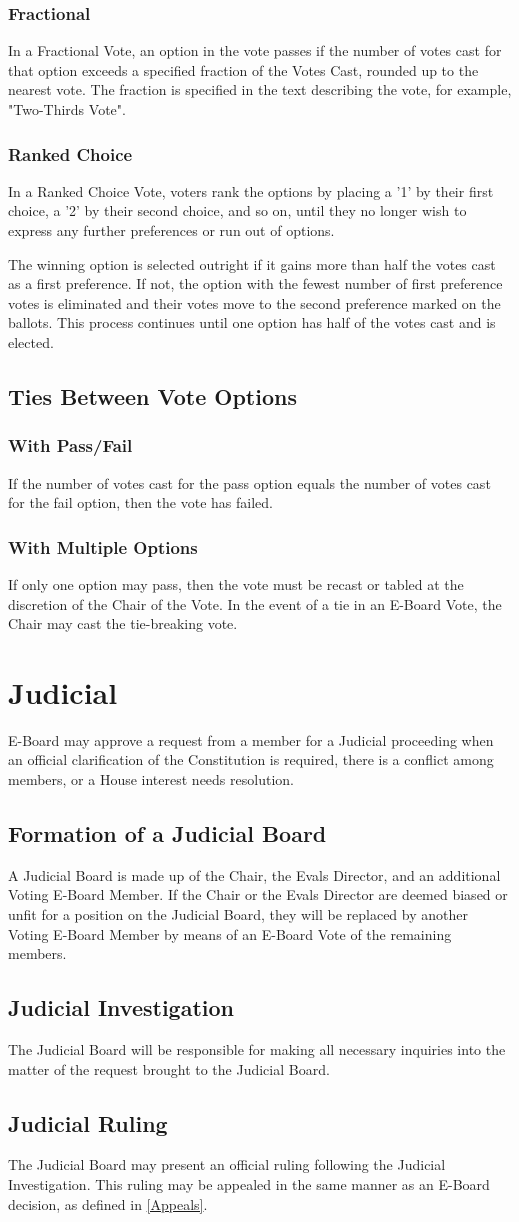 \documentclass{article}
\newcommand{\article}[1]{\section{#1} \label{#1}}
\newcommand{\asection}[1]{\subsection{#1} \label{#1}}
\newcommand{\asubsection}[1]{\subsubsection{#1} \label{#1}}
\begin{document}
\asubsection{Fractional}
In a Fractional Vote, an option in the vote passes if the number of votes cast for that option exceeds a specified fraction of the Votes Cast, rounded up to the nearest vote.
The fraction is specified in the text describing the vote, for example, "Two-Thirds Vote".

\asubsection{Ranked Choice}
In a Ranked Choice Vote, voters rank the options by placing a '1' by their first choice, a '2' by their second choice, and so on, until they no longer wish to express any further preferences or run out of options.

The winning option is selected outright if it gains more than half the votes cast as a first preference.
If not, the option with the fewest number of first preference votes is eliminated and their votes move to the second preference marked on the ballots.
This process continues until one option has half of the votes cast and is elected.

\asection{Ties Between Vote Options}

\asubsection{With Pass/Fail}
If the number of votes cast for the pass option equals the number of votes cast for the fail option, then the vote has failed.

\asubsection{With Multiple Options}
If only one option may pass, then the vote must be recast or tabled at the discretion of the Chair of the Vote.
In the event of a tie in an E-Board Vote, the Chair may cast the tie-breaking vote.

\article{Judicial}
E-Board may approve a request from a member for a Judicial proceeding when an official clarification of the Constitution is required, there is a conflict among members, or a House interest needs resolution.

\asection{Formation of a Judicial Board}
A Judicial Board is made up of the Chair, the Evals Director, and an additional Voting E-Board Member.
If the Chair or the Evals Director are deemed biased or unfit for a position on the Judicial Board, they will be replaced by another Voting E-Board Member by means of an E-Board Vote of the remaining members.

\asection{Judicial Investigation}
The Judicial Board will be responsible for making all necessary inquiries into the matter of the request brought to the Judicial Board.

\asection{Judicial Ruling}
The Judicial Board may present an official ruling following the Judicial Investigation.
This ruling may be appealed in the same manner as an E-Board decision, as defined in \ref{Appeals}.
\end{document}
